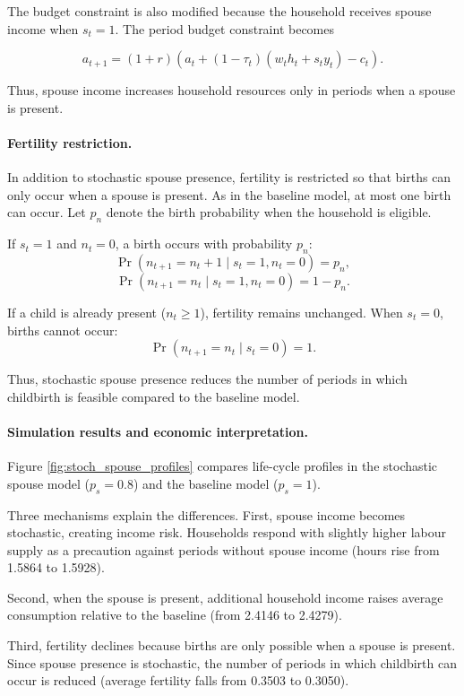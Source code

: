 The budget constraint is also modified because the household receives spouse income when $s_t=1$. 
The period budget constraint becomes

\[
a_{t+1} = (1+r)(a_t + (1-\tau_t)(w_t h_t + s_t y_t) - c_t).
\]

Thus, spouse income increases household resources only in periods when a spouse is present.

\paragraph{Fertility restriction.}

In addition to stochastic spouse presence, fertility is restricted so that births can only occur when a spouse is present. As in the baseline model, at most one birth can occur. Let $p_n$ denote the birth probability when the household is eligible.

If $s_t=1$ and $n_t=0$, a birth occurs with probability $p_n$:
\[
\Pr(n_{t+1}=n_t+1 \mid s_t=1,n_t=0)=p_n,
\]
\[
\Pr(n_{t+1}=n_t \mid s_t=1,n_t=0)=1-p_n.
\]

If a child is already present ($n_t\ge1$), fertility remains unchanged. When $s_t=0$, births cannot occur:
\[
\Pr(n_{t+1}=n_t \mid s_t=0)=1.
\]

Thus, stochastic spouse presence reduces the number of periods in which childbirth is feasible compared to the baseline model.
\paragraph{Simulation results and economic interpretation.}

Figure \ref{fig:stoch_spouse_profiles} compares life-cycle profiles in the stochastic spouse model ($p_s=0.8$) and the baseline model ($p_s=1$).

Three mechanisms explain the differences. First, spouse income becomes stochastic, creating income risk. Households respond with slightly higher labour supply as a precaution against periods without spouse income (hours rise from 1.5864 to 1.5928).

Second, when the spouse is present, additional household income raises average consumption relative to the baseline (from 2.4146 to 2.4279).

Third, fertility declines because births are only possible when a spouse is present. Since spouse presence is stochastic, the number of periods in which childbirth can occur is reduced (average fertility falls from 0.3503 to 0.3050).


